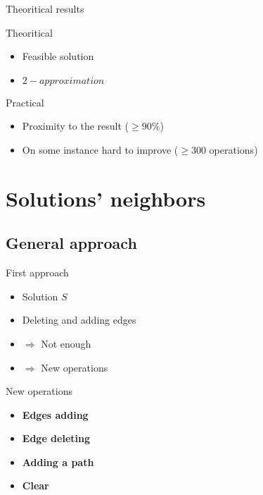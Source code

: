 \documentclass[11pt]{beamer}
\begin{document}
\begin{frame}{Theoritical results}

\begin{block}{Theoritical}

\begin{itemize}
	\item Feasible solution
	\item $2-approximation$
\end{itemize}

\end{block}

\begin{exampleblock}{Practical}

\begin{itemize}
	\item Proximity to the result ($\geq 90\%$)
	\item On some instance hard to improve  ($\geq 300$ operations)
\end{itemize}
\end{exampleblock}

\end{frame}




\section{Solutions' neighbors}

\subsection{General approach}
\begin{frame}{First approach}
\begin{itemize}
	\item<1->[] Solution $S$\\
	\item<1->[] Deleting and adding edges\\
	\item<2->[]$\Rightarrow$ Not enough\\
	\item<3->[]$\Rightarrow$ New operations\\

\end{itemize}	
\end{frame}

\begin{frame}{New operations}

\begin{itemize}   
\item \textbf{Edges adding}
\item \textbf{Edge deleting}  
\item \textbf{Adding a path}
\item  \textbf{Clear}
\end{itemize}

\end{frame}
\end{document}
